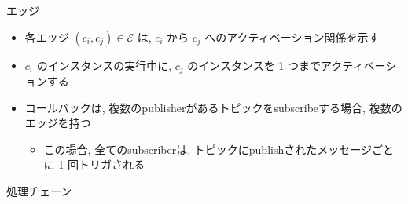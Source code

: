 
\begin{frame}{エッジ}
    \begin{itemize}
        \item 各エッジ $\left(c_{i}, c_{j}\right) \in \mathcal{E}$ は, $c_{i}$ から $c_{j}$ へのアクティベーション関係を示す
        \item $c_{i}$ のインスタンスの実行中に, $c_{j}$ のインスタンスを 1 つまでアクティベーションする
        \item コールバックは, 複数のpublisherがあるトピックをsubscribeする場合, 複数のエッジを持つ
              \begin{itemize}
                  \item この場合, 全てのsubscriberは, トピックにpublishされたメッセージごとに 1 回トリガされる
              \end{itemize}
    \end{itemize}
\end{frame}

\begin{frame}{処理チェーン}
\end{frame}

